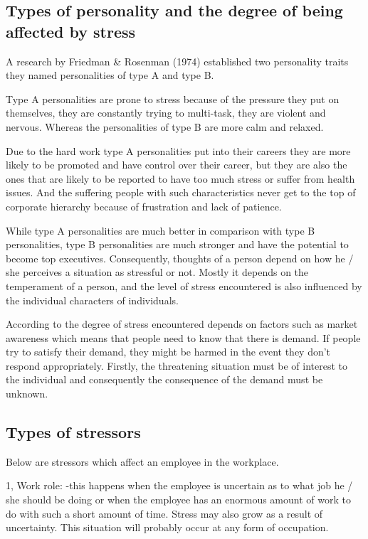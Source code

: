 \subsection{Types of personality and the degree of being affected by stress} 
A research by Friedman \& Rosenman (1974) established two personality traits they named personalities of type A and type B.  

Type A personalities are prone to stress because of the pressure they put on themselves, they are constantly trying to multi-task, they are violent and nervous. Whereas the personalities of type B are more calm and relaxed.

Due to the hard work type A personalities put into their careers they are more likely to be promoted and have control over their career, but they are also the ones that are likely to be reported to have too much stress or suffer from health issues. And the suffering people with such characteristics never get to the top of corporate hierarchy because of frustration and lack of patience.

While type A personalities are much better in comparison with type B personalities, type B personalities are much stronger and have the potential to become top executives. Consequently, thoughts of a person depend on how he / she perceives a situation as stressful or not.  Mostly it depends on the temperament of a person, and the level of stress encountered is also influenced by the individual characters of individuals. \citep[p.314]{Bloisi2007ManagementBehaviour}

According to \cite{LazarusR.S.Folkman1984StressCoping.} the degree of stress encountered depends on factors such as market awareness which means that people need to know that there is demand. If people try to satisfy their demand, they might be harmed in the event they don't respond appropriately. Firstly, the threatening situation must be of interest to the individual and consequently the consequence of the demand must be unknown. \citep[p.310]{Bloisi2007ManagementBehaviour}

\subsection{Types of stressors}
Below are stressors which affect an employee in the workplace. 

1, Work role: -this happens when the employee is uncertain as to what job he / she should be doing or when the employee has an enormous amount of work to do with such a short amount of time. Stress may also grow as a result of uncertainty.  This situation will probably occur at any form of occupation.

